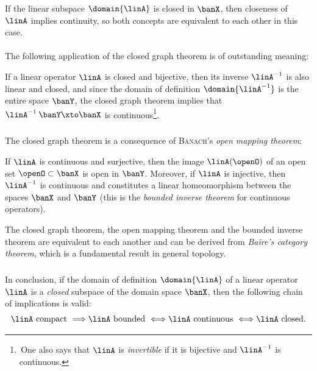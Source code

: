 \documentclass[11pt,twoside]{article}
\begin{document}
\begin{theorem1}\label{CLOSED_GRAPH_THEOREM}
If the linear subspace $\domain{\linA}$ is closed in $\banX$,
then closeness of $\linA$ implies continuity,
so both concepts are equivalent to each other in this case.
\end{theorem1}

\paragraph{} %
The following application of the closed graph theorem
is of outstanding meaning:

\begin{theorem1}\label{BOUNDED_INVERSE_THEOREM}
If a linear operator $\linA$ is closed and bijective,
then its inverse $\linA^{-1}$ is also linear and closed,
and since the domain of definition $\domain{\linA^{-1}}$
is the entire space $\banY$,
the closed graph theorem implies that $\linA^{-1} \: \banY \xto \banX$
is continuous\footnote{
\,One also says that $\linA$ is \textit{invertible}
if it is bijective and $\linA^{-1}$ is continuous.}.
\end{theorem1}

\subparagraph{} %
The closed graph theorem is a consequence of
\textsc{Banach}'s \textit{open mapping theorem}:

\begin{theorem1}\label{OPEN_MAPPING_THEOREM}
If $\linA$ is continuous and surjective,
then the image $\linA(\openO)$ of an open set $\openO \subset \banX$
is open in $\banY$.
Moreover,
if $\linA$ is injective,
then $\linA^{-1}$ is continuous
and constitutes a linear homeomorphism between the spaces $\banX$ and $\banY$
(this is the \textit{bounded inverse theorem} for continuous operators).
\end{theorem1}

The closed graph theorem,
the open mapping theorem and
the bounded inverse theorem
are equivalent to each another
and can be derived from \textit{{Baire}'s category theorem},
which is a fundamental result in general topology.

\subparagraph{} %
In conclusion,
if the domain of definition $\domain{\linA}$ of a linear operator $\linA$
is a \textit{closed} subspace of the domain space $\banX$,
then the following chain of implications is valid:
\[
\linA \mbox{ compact }     \Longrightarrow
\linA \mbox{ bounded }     \Longleftrightarrow
\linA \mbox{ continuous }  \Longleftrightarrow
\linA \mbox{ closed}.     %
\]
\end{document}

